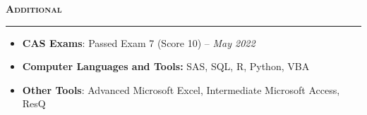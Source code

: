 \documentclass[11pt,letterpaper]{article}
\newcommand{\sectline}{\vspace{5pt}\hrule height 1.5pt\vspace{5pt}}
\newcommand{\heading}[1]{{\fontsize{12pt}{13pt} {\textbf{\textsc{#1}}}}}
\begin{document}
\heading{Additional}\sectline
\begin{itemize}
	\item \textbf{CAS Exams}: Passed Exam 7 (Score 10) -- \textit{May 2022}
	\item \textbf{Computer Languages and Tools:} SAS, SQL, R, Python, VBA
	\item \textbf{Other Tools}: Advanced Microsoft Excel, Intermediate Microsoft Access, ResQ
\end{itemize}
\end{document}
